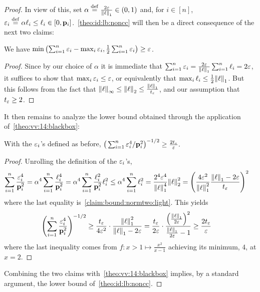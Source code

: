 \begin{proof}
\noindent In view of this, set
$
  \alpha \stackrel{\rm def}{=} \frac{2\varepsilon}{{\lVert\ell{\rVert}}_1} \in (0,1)
$
and, for $i\in[n]$, $\varepsilon_i \stackrel{\rm def}{=} \alpha \ell_i \leq \ell_i \in [0,\mathbf{p}_i]$.~\cref{theo:id:lb:noncc} will then be a direct consequence of the next two claims:

\begin{claim}[Distance] We have
  $\min\left(\sum_{i=1}^n \varepsilon_i - \max_i \varepsilon_i, \frac{1}{2}\sum_{i=1}^n \varepsilon_i\right) \geq \varepsilon$.
\end{claim}
\begin{proof}
Since by our choice of $\alpha$ it is immediate that $\sum_{i=1}^n \varepsilon_i = \frac{2\varepsilon}{{\lVert\ell{\rVert}}_1}\sum_{i=1}^n \ell_i = 2\varepsilon$, it suffices to show that $\max_i \varepsilon_i \leq \varepsilon$, or equivalently that $\max_i \ell_i \leq \frac{1}{2}{\lVert\ell{\rVert}}_1$. But this follows from the fact that ${\lVert\ell{\rVert}}_\infty \leq {\lVert\ell{\rVert}}_2 \leq \frac{{\lVert\ell{\rVert}}_1}{t_\varepsilon}$, and our assumption that $t_\varepsilon\geq 2$.
\end{proof}

It then remains to analyze the lower bound obtained through the application of~\cref{theo:vv:14:blackbox}:
\begin{claim}
  With the $\varepsilon_i$'s defined as before,
  $
      \big(\sum_{i=1}^n {\varepsilon_i^4}/{\mathbf{p}_i^2}\big)^{-1/2} \geq \frac{2t_\varepsilon}{\varepsilon}.
  $
\end{claim}
\begin{proof}
Unrolling the definition of the $\varepsilon_i$'s,
\begin{align*}
  \sum_{i=1}^n \frac{\varepsilon_i^4}{\mathbf{p}_i^2}
    &=  \alpha^4 \sum_{i=1}^n \frac{\ell_i^4}{\mathbf{p}_i^2}
    =  \alpha^4 \sum_{i=1}^n \frac{\ell_i^2}{\mathbf{p}_i^2} \ell_i^2
    \leq  \alpha^4 \sum_{i=1}^n \ell_i^2 
    = \frac{2^4\varepsilon^4}{{\lVert\ell{\rVert}}_1^4} {\lVert\ell{\rVert}}_2^2
    = \left(\frac{4\varepsilon^2}{{\lVert\ell{\rVert}}_1^2} \frac{{\lVert\ell{\rVert}}_1-2\varepsilon}{t_\varepsilon}\right)^2
\end{align*}
where the last equality is~\eqref{claim:bound:normtwo:light}. This yields
\begin{align*}
  \left(\sum_{i=1}^n \frac{\varepsilon_i^4}{\mathbf{p}_i^2}\right)^{-1/2} 
  &\geq \frac{t_\varepsilon}{4\varepsilon^2}\cdot \frac{{\lVert\ell{\rVert}}_1^2}{{\lVert\ell{\rVert}}_1-2\varepsilon} 
  = \frac{t_\varepsilon}{2\varepsilon}\cdot \frac{\left(\frac{{\lVert\ell{\rVert}}_1}{2\varepsilon}\right)^2}{\frac{{\lVert\ell{\rVert}}_1}{2\varepsilon}-1} 
  \geq \frac{2t_\varepsilon}{\varepsilon}
\end{align*}
where the last inequality comes from $f\colon x>1 \mapsto \frac{x^2}{x-1}$ achieving its minimum, $4$, at $x=2$.
\end{proof}
Combining the two claims with~\cref{theo:vv:14:blackbox} implies, by a standard argument, the lower bound of~\cref{theo:id:lb:noncc}.
\end{proof}

